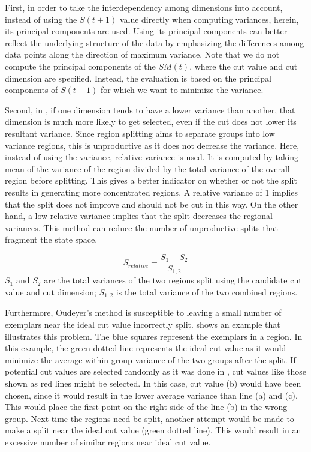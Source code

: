First, in order to take the interdependency among dimensions into account, instead of using the $S(t+1)$ value directly when computing variances, herein, its principal components are used. Using its principal components can better reflect the underlying structure of the data by emphasizing the differences among data points along the direction of maximum variance. Note that we do not compute the principal components of the $SM(t)$, where the cut value and cut dimension are specified. Instead, the evaluation is based on the principal components of $S(t+1)$ for which we want to minimize the variance. 

Second, in \cite{Oudeyer2007}, if one dimension tends to have a lower variance than another, that dimension is much more likely to get selected, even if the cut does not lower its resultant variance. Since region splitting aims to separate groups into low variance regions, this is unproductive as it does not decrease the variance. Here, instead of using the variance, relative variance is used. It is computed by taking mean of the variance of the region divided by the total variance of the overall region before splitting. This gives a better indicator on whether or not the split results in generating more concentrated regions. A relative variance of 1 implies that the split does not improve and should not be cut in this way. On the other hand, a low relative variance implies that the split decreases the regional variances. This method can reduce the number of unproductive splits that fragment the state space.

\begin{equation}
S_{relative} = \frac{S_1+S_2}{S_{1,2}}
\end{equation}
$S_1$ and $S_2$ are the total variances of the two regions split using the candidate cut value and cut dimension; $S_{1,2}$ is the total variance of the two combined regions.

Furthermore, Oudeyer's method is susceptible to leaving a small number of exemplars near the ideal cut value incorrectly split.  shows an example that illustrates this problem. The blue squares represent the exemplars in a region. In this example, the green dotted line represents the ideal cut value as it would minimize the average within-group variance of the two groups after the split. If potential cut values are selected randomly as it was done in \cite{Oudeyer2005}, cut values like those shown as red lines might be selected. In this case, cut value (b) would have been chosen, since it would result in the lower average variance than line (a) and (c). This would place the first point on the right side of the line (b) in the wrong group. Next time the regions need be split, another attempt would be made to make a split near the ideal cut value (green dotted line). This would result in an excessive number of similar regions near ideal cut value. 


